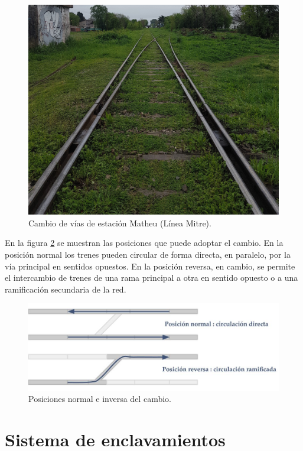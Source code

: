 			\begin{figure}[h!]
				\centering
				\includegraphics[scale=.1]{./Figures/Cambios_2}
				\caption{Cambio de vías de estación Matheu (Línea Mitre).}
				\label{fig:Cambios_2}
			\end{figure} 
		
			En la figura \ref{fig:Cambios} se muestran las posiciones que puede adoptar el cambio. En la posición normal los trenes pueden circular de forma directa, en paralelo, por la vía principal en sentidos opuestos. En la posición reversa, en cambio, se permite el intercambio de trenes de una rama principal a otra en sentido opuesto o a una ramificación secundaria de la red.
			
			\begin{figure}[h!]
				\centering
				\includegraphics[scale=.4]{./Figures/Cambios}
				\caption{Posiciones normal e inversa del cambio.}
				\label{fig:Cambios}
			\end{figure} 	
					
	\section{Sistema de enclavamientos}

